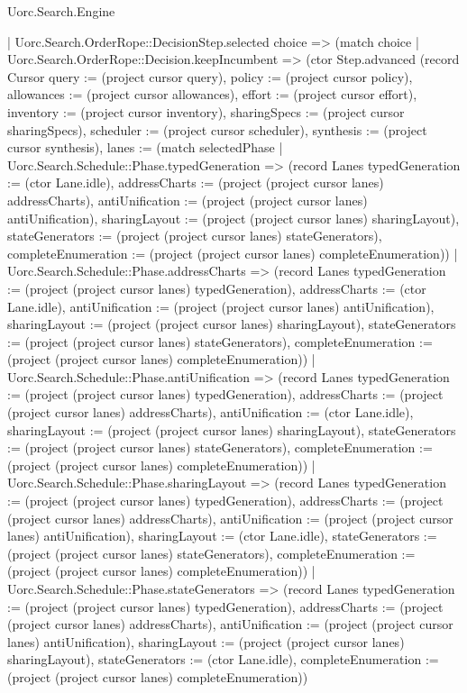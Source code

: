 \begin{lexlean}{Uorc.Search.Engine}
\begin{semanticmodule}
{      | Uorc.Search.OrderRope::DecisionStep.selected choice => (match choice
        | Uorc.Search.OrderRope::Decision.keepIncumbent => (ctor Step.advanced (record Cursor {query := (project cursor query), policy := (project cursor policy), allowances := (project cursor allowances), effort := (project cursor effort), inventory := (project cursor inventory), sharingSpecs := (project cursor sharingSpecs), scheduler := (project cursor scheduler), synthesis := (project cursor synthesis), lanes := (match selectedPhase
          | Uorc.Search.Schedule::Phase.typedGeneration => (record Lanes {typedGeneration := (ctor Lane.idle), addressCharts := (project (project cursor lanes) addressCharts), antiUnification := (project (project cursor lanes) antiUnification), sharingLayout := (project (project cursor lanes) sharingLayout), stateGenerators := (project (project cursor lanes) stateGenerators), completeEnumeration := (project (project cursor lanes) completeEnumeration)})
          | Uorc.Search.Schedule::Phase.addressCharts => (record Lanes {typedGeneration := (project (project cursor lanes) typedGeneration), addressCharts := (ctor Lane.idle), antiUnification := (project (project cursor lanes) antiUnification), sharingLayout := (project (project cursor lanes) sharingLayout), stateGenerators := (project (project cursor lanes) stateGenerators), completeEnumeration := (project (project cursor lanes) completeEnumeration)})
          | Uorc.Search.Schedule::Phase.antiUnification => (record Lanes {typedGeneration := (project (project cursor lanes) typedGeneration), addressCharts := (project (project cursor lanes) addressCharts), antiUnification := (ctor Lane.idle), sharingLayout := (project (project cursor lanes) sharingLayout), stateGenerators := (project (project cursor lanes) stateGenerators), completeEnumeration := (project (project cursor lanes) completeEnumeration)})
          | Uorc.Search.Schedule::Phase.sharingLayout => (record Lanes {typedGeneration := (project (project cursor lanes) typedGeneration), addressCharts := (project (project cursor lanes) addressCharts), antiUnification := (project (project cursor lanes) antiUnification), sharingLayout := (ctor Lane.idle), stateGenerators := (project (project cursor lanes) stateGenerators), completeEnumeration := (project (project cursor lanes) completeEnumeration)})
          | Uorc.Search.Schedule::Phase.stateGenerators => (record Lanes {typedGeneration := (project (project cursor lanes) typedGeneration), addressCharts := (project (project cursor lanes) addressCharts), antiUnification := (project (project cursor lanes) antiUnification), sharingLayout := (project (project cursor lanes) sharingLayout), stateGenerators := (ctor Lane.idle), completeEnumeration := (project (project cursor lanes) completeEnumeration)})
}}
\end{semanticmodule}
\end{lexlean}
